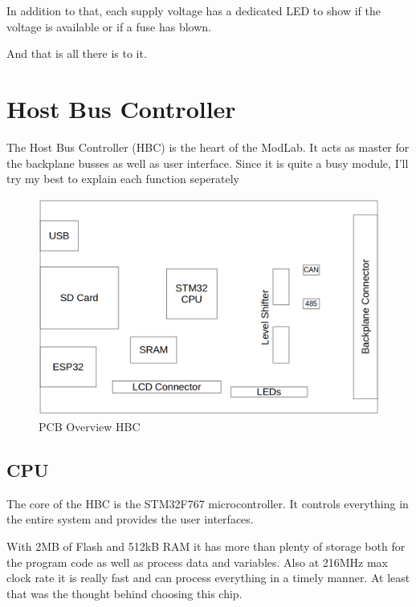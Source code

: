 In addition to that, each supply voltage has a dedicated LED to show if the voltage is available or if a fuse has blown. 

And that is all there is to it. 


\section{Host Bus Controller}
The Host Bus Controller (HBC) is the heart of the ModLab. It acts as master for the backplane busses as well as user interface. Since it is quite a busy module, I'll try my best to explain each function seperately

\begin{figure}[H]
	\centering
		\includegraphics[width=\textwidth]{pictures/overview_cpu.png}
	\caption{PCB Overview HBC}
	\label{img:HBC}
\end{figure}

\subsection{CPU}

The core of the HBC is the STM32F767 microcontroller. It controls everything in the entire system and provides the user interfaces. 

With 2MB of Flash and 512kB RAM it has more than plenty of storage both for the program code as well as process data and variables. Also at 216MHz max clock rate it is really fast and can process everything in a timely manner. At least that was the thought behind choosing this chip. 

